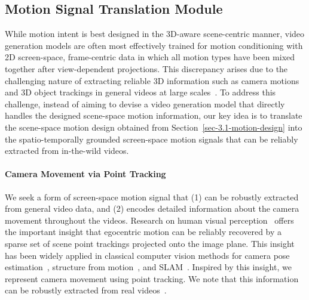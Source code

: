 \subsection{Motion Signal Translation Module}

While motion intent is best designed in the 3D-aware scene-centric manner, video generation models are often most effectively trained for motion conditioning with 2D screen-space, frame-centric data in which all motion types have been mixed together after view-dependent projections. 
This discrepancy arises due to the challenging nature of extracting reliable 3D information such as camera motions and 3D object trackings in general videos at large scales~\cite{zhou2018stereo}. 
To address this challenge, instead of aiming to devise a video generation model that directly handles the designed scene-space motion information, our key idea is to translate the scene-space motion design obtained from Section~\ref{sec-3.1-motion-design} into the spatio-temporally grounded screen-space motion signals that can be reliably extracted from in-the-wild videos. 

\paragraph{\textbf{Camera Movement via Point Tracking}}
We seek a form of screen-space motion signal that (1) can be robustly extracted from general video data, and (2) encodes detailed information about the camera movement throughout the videos.
Research on human visual perception~\cite{perception book} offers the important insight that egocentric motion can be reliably recovered by a sparse set of scene point trackings projected onto the image plane. This insight has been widely applied in classical computer vision methods for camera pose estimation~\cite{survey paper}, structure from motion~\cite{survey paper}, and SLAM~\cite{survey paper}.
Inspired by this insight, we represent camera movement using point tracking. We note that this information can be robustly extracted from real videos~\cite{cho2025local,karaev2024cotracker3}. 

